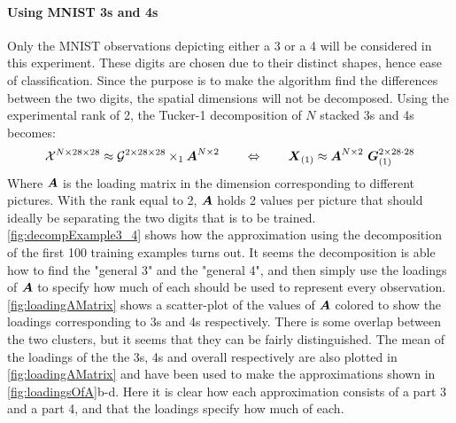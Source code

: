 \paragraph{Using MNIST 3s and 4s}
Only the MNIST observations depicting either a 3 or a 4 will be considered in this experiment. These digits are chosen due to their distinct shapes, hence ease of classification. Since the purpose is to make the algorithm find the differences between the two digits, the spatial dimensions will not be decomposed. Using the experimental rank of 2, the Tucker-1 decomposition of $N$ stacked 3s and 4s becomes:
\begin{equation}
    \tensor{X}^{N\times 28\times 28} \approx \tensor{G}^{2 \times 28 \times 28} \times_1 \bs{A}^{N\times 2} \qquad \Leftrightarrow \qquad \bs{X}_{(1)} \approx \bs{A}^{N\times 2} \ \bs{G}^{2 \times 28\cdot 28}_{(1)}
\end{equation}
Where $\boldsymbol{A}$ is the loading matrix in the dimension corresponding to different pictures. With the rank equal to 2, $\boldsymbol{A}$ holds 2 values per picture that should ideally be separating the two digits that is to be trained. \autoref{fig:decompExample3_4} shows how the approximation using the decomposition of the first 100 training examples turns out. It seems the decomposition is able how to find the "general 3" and the "general 4", and then simply use the loadings of $\boldsymbol{A}$ to specify how much of each should be used to represent every observation. \autoref{fig:loadingAMatrix} shows a scatter-plot of the values of $\boldsymbol{A}$ colored to show the loadings corresponding to 3s and 4s respectively. There is some overlap between the two clusters, but it seems that they can be fairly distinguished. The mean of the loadings of the the 3s, 4s and overall respectively are also plotted in \autoref{fig:loadingAMatrix} and have been used to make the approximations shown in \autoref{fig:loadingsOfA}b-d. Here it is clear how each approximation consists of a part 3 and a part 4, and that the loadings specify how much of each.
